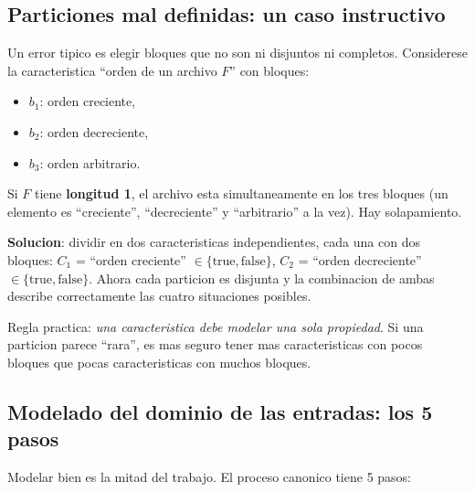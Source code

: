 \documentclass[12pt,a4paper]{article}
\begin{document}
\subsection{Particiones mal definidas: un caso instructivo}

Un error tipico es elegir bloques que no son ni disjuntos ni completos. Considerese la
caracteristica ``orden de un archivo \(F\)'' con bloques:
\begin{itemize}
  \item \(b_1\): orden creciente,
  \item \(b_2\): orden decreciente,
  \item \(b_3\): orden arbitrario.
\end{itemize}

Si \(F\) tiene \textbf{longitud 1}, el archivo esta simultaneamente en los tres bloques (un
elemento es ``creciente'', ``decreciente'' y ``arbitrario'' a la vez). Hay solapamiento.

\textbf{Solucion}: dividir en dos caracteristicas independientes, cada una con dos bloques:
\(C_1\) = ``orden creciente'' \(\in \{\text{true},\text{false}\}\), \(C_2\) = ``orden
decreciente'' \(\in \{\text{true},\text{false}\}\). Ahora cada particion es disjunta y la
combinacion de ambas describe correctamente las cuatro situaciones posibles.

\begin{ideabox}
Regla practica: \emph{una caracteristica debe modelar una sola propiedad}. Si una particion
parece ``rara'', es mas seguro tener mas caracteristicas con pocos bloques que pocas
caracteristicas con muchos bloques.
\end{ideabox}

\subsection{Modelado del dominio de las entradas: los 5 pasos}

Modelar bien es la mitad del trabajo. El proceso canonico tiene 5 pasos:
\end{document}
